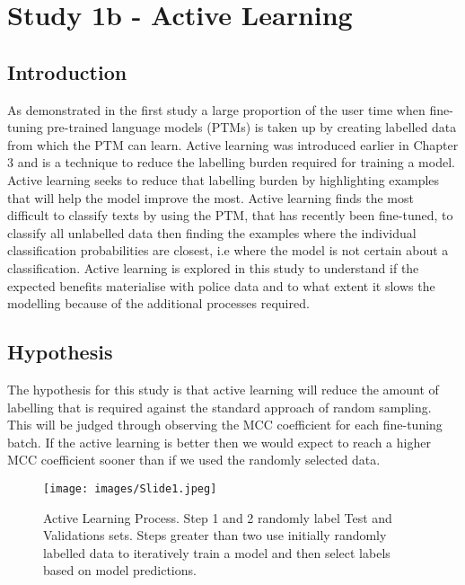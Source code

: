 \chapter{Study 1b - Active Learning}


\section{Introduction} As demonstrated in the first study a large proportion of the user time when fine-tuning pre-trained language models (PTMs) is taken up by creating labelled data from which the PTM can learn. Active learning was introduced earlier in Chapter 3 and is a technique to reduce the labelling burden required for training a model. Active learning seeks to reduce that labelling burden by highlighting examples that will help the model improve the most. Active learning finds the most difficult to classify texts by using the PTM, that has recently been fine-tuned, to classify all unlabelled data then finding the examples where the individual classification probabilities are closest, i.e where the model is not certain about a classification.  Active learning is explored in this study to understand if the expected benefits materialise with police data and to what extent it slows the modelling because of the additional processes required.

\section{Hypothesis}

The hypothesis for this study is that active learning will reduce the amount of labelling that is required against the standard approach of random sampling. This will be judged through observing the MCC coefficient for each fine-tuning batch. If the active learning is better then we would expect to reach a higher MCC coefficient sooner than if we used the randomly selected data.

\begin{figure}[!tbp]
  \centering
    \texttt{[image: images/Slide1.jpeg]}
    \caption[Active Learning Process.]{Active Learning Process. Step 1 and 2 randomly label Test and Validations sets. Steps greater than two use initially randomly labelled data to iteratively train a model and then select labels based on model predictions.}
    \label{fig:active_process}
\end{figure}


